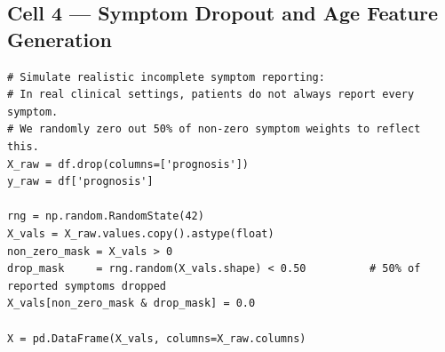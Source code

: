 \documentclass[12pt,a4paper]{article}
\begin{document}
\subsection{Cell 4 --- Symptom Dropout and Age Feature Generation}

\begin{lstlisting}[caption=Cell 4: 50\% Symptom Dropout and Epidemiological Age Feature]
# Simulate realistic incomplete symptom reporting:
# In real clinical settings, patients do not always report every symptom.
# We randomly zero out 50% of non-zero symptom weights to reflect this.
X_raw = df.drop(columns=['prognosis'])
y_raw = df['prognosis']

rng = np.random.RandomState(42)
X_vals = X_raw.values.copy().astype(float)
non_zero_mask = X_vals > 0
drop_mask     = rng.random(X_vals.shape) < 0.50          # 50% of reported symptoms dropped
X_vals[non_zero_mask & drop_mask] = 0.0

X = pd.DataFrame(X_vals, columns=X_raw.columns)


\end{lstlisting}
\end{document}
